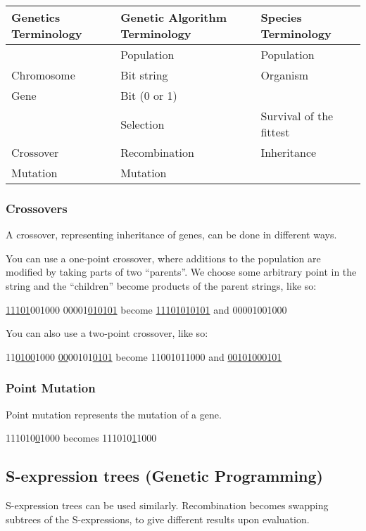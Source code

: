 \begin{tabular}{| l | l | l |}
    \hline
    Genetics Terminology & Genetic Algorithm Terminology & Species Terminology\\ \hline
                         & Population                    & Population\\ \hline
    Chromosome           & Bit string                    & Organism\\ \hline
    Gene                 & Bit (0 or 1)                  & \\ \hline
                         & Selection                     & Survival of the fittest\\ \hline
    Crossover            & Recombination                 & Inheritance\\ \hline
    Mutation             & Mutation                      & \\ \hline
\end{tabular}

\subsubsection{Crossovers}
A crossover, representing inheritance of genes, can be done in different ways.

You can use a one-point crossover, where additions to the population are
modified by taking parts of two ``parents''. We choose some arbitrary point in
the string and the ``children'' become products of the parent strings, like so:

\underline{11101}001000 00001\underline{010101} become \underline{11101010101} and 00001001000

You can also use a two-point crossover, like so:

11\underline{0100}1000 \underline{00}00101\underline{0101} become 11001011000 and \underline{00101000101}

\subsubsection{Point Mutation}
Point mutation represents the mutation of a gene.

111010\underline{0}1000 becomes 111010\underline{1}1000

\subsection{S-expression trees (Genetic Programming)}
S-expression trees can be used similarly. Recombination becomes swapping
subtrees of the S-expressions, to give different results upon evaluation.

